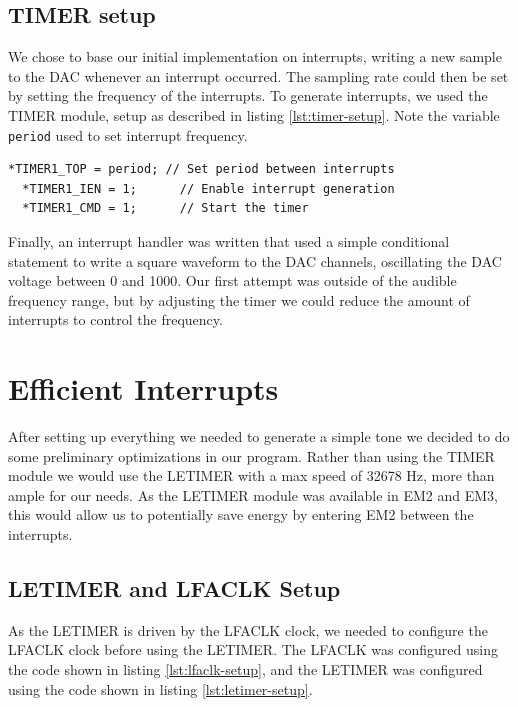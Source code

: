 \subsection{TIMER setup}
We chose to base our initial implementation on interrupts, writing a new sample to the DAC whenever an interrupt occurred. The sampling rate could then be set by setting the frequency of the interrupts. To generate interrupts, we used the TIMER module, setup as described in listing \ref{lst:timer-setup}. Note the variable \texttt{period} used to set interrupt frequency. \\

\noindent\begin{minipage}[c]{\textwidth}
  \begin{lstlisting}[caption=Setting up the timer to generate interrupts,label={lst:timer-setup}]
  *TIMER1_TOP = period; // Set period between interrupts
  *TIMER1_IEN = 1;      // Enable interrupt generation
  *TIMER1_CMD = 1;      // Start the timer
  \end{lstlisting}
\end{minipage}

Finally, an interrupt handler was written that used a simple conditional statement to write a square waveform to the DAC channels, oscillating the DAC voltage between 0 and 1000. Our first attempt was outside of the audible frequency range, but by adjusting the timer we could reduce the amount of interrupts to control the frequency.


\section{Efficient Interrupts}
After setting up everything we needed to generate a simple tone we decided to do some preliminary optimizations in our program. Rather than using the TIMER module we would use the LETIMER with a max speed of 32678 Hz, more than ample for our needs. As the LETIMER module was available in EM2 and EM3, this would allow us to potentially save energy by entering EM2 between the interrupts. \\


\subsection{LETIMER and LFACLK Setup}
As the LETIMER is driven by the LFACLK clock, we needed to configure the LFACLK clock before using the LETIMER. The LFACLK was configured using the code shown in listing \ref{lst:lfaclk-setup}, and the LETIMER was configured using the code shown in listing \ref{lst:letimer-setup}. 

